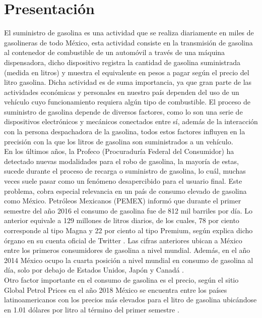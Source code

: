 
\section{Presentación} %
El suministro de gasolina es una actividad que se realiza diariamente en miles de gasolineras de todo México, esta actividad consiste en la transmisión de gasolina al contenedor de combustible de un automóvil a través de una máquina dispensadora, dicho dispositivo registra la cantidad de gasolina suministrada (medida en litros) y muestra el equivalente en pesos a pagar según el precio del litro gasolina.
Dicha actividad es de suma importancia, ya que gran parte de las actividades económicas y personales en nuestro país dependen del uso de un vehículo cuyo funcionamiento requiera algún tipo de combustible. El proceso de suministro de gasolina depende de diversos factores, como lo son una serie de dispositivos electrónicos y mecánicos conectados entre sí, además de la interacción con la persona despachadora de la gasolina, todos estos factores influyen en la precisión con la que los litros de gasolina son suministrados a un vehículo.
\\
En los últimos años, la Profeco (Procuraduría Federal del Consumidor) ha detectado nuevas modalidades para el robo de gasolina, la mayoría de estas, sucede durante el proceso de recarga o suministro de gasolina, lo cuál, muchas veces suele pasar como un fenómeno desapercibido para el usuario final. 
Este problema, cobra especial relevancia en un país de consumo elevado de gasolina como México. Petróleos Mexicanos (PEMEX) informó que durante el primer semestre del año 2016 el consumo de gasolina fue de 812 mil barriles por día. Lo anterior equivale a 129 millones de litros diarios, de los cuales, 78 por ciento corresponde al tipo Magna y 22 por ciento al tipo Premium, según explica dicho órgano en su cuenta oficial de Twitter \cite{Pre1}.
Las cifras anteriores ubican a México entre los primeros consumidores de gasolina a nivel mundial. Además, en el año 2014 México ocupo la cuarta posición a nivel mundial en consumo de gasolina al día, solo por debajo de Estados Unidos, Japón y Canadá \citep{Pre2}.
\\
Otro factor importante en el consumo de gasolina es el precio, según el sitio Global Petrol Prices en el año 2018 México se encuentra entre los países latinoamericanos con los precios más elevados para el litro de gasolina ubicándose en 1.01 dólares por litro al término del primer semestre \citep{Pre3}.

